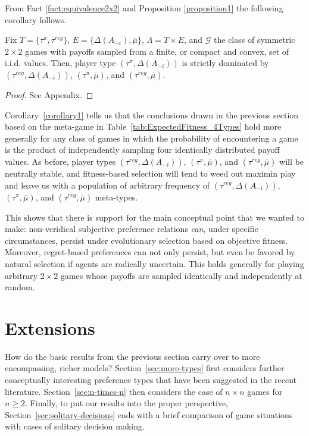 \documentclass[fleqn,reqno,11pt]{article}
\begin{document}
From Fact \ref{fact:equivalence2x2} and Proposition \ref{proposition1} the following corollary follows.

\begin{corollary} \label{corollary1}

  Fix $T = \lbrace \tau^{\pi}, \tau^{reg} \rbrace$,
  $E = \lbrace \Delta(A_{-i}), \overline{\mu} \rbrace$, $\Lambda= T \times E$, and
  $\mathcal{G}$ the class of symmetric $2 \times 2$ games with payoffs sampled from a finite,
  or compact and convex, set of i.i.d. values. Then, player type $(\tau^{\pi}, \Delta(A_{-i}))$
  is strictly dominated by $(\tau^{reg}, \Delta(A_{-i}))$, $(\tau^{\pi}, \overline{\mu})$, and
  $(\tau^{reg}, \overline{\mu})$.

\end{corollary}

\begin{proof}
See Appendix.
\end{proof}

Corollary~\ref{corollary1} tells us that the conclusions drawn in the previous section based on
the meta-game in Table~\ref{tab:ExpectedFitness_4Types} hold more generally for any class of
games in which the probability of encountering a game is the product of independently sampling
four identically distributed payoff values. As before, player types
$(\tau^{reg}, \Delta(A_{-i}))$, $(\tau^{\pi}, \overline{\mu})$, and
$(\tau^{reg}, \overline{\mu})$ will be neutrally stable, and fitness-based selection will tend
to weed out maximin play and leave us with a population of arbitrary frequency of
$(\tau^{reg}, \Delta(A_{-i}))$, $(\tau^{\pi}, \overline{\mu})$, and
$(\tau^{reg}, \overline{\mu})$ meta-types.

This shows that there is support for the main conceptual point that we wanted to make:
non-veridical subjective preference relations \emph{can}, under specific circumstances, persist
under evolutionary selection based on objective fitness. Moreover, regret-based preferences can
not only persist, but even be favored by natural selection if agents are radically
uncertain. This holds generally for playing arbitrary $2 \times 2$ games whose payoffs are
sampled identically and independently at random.

\section{Extensions}
\label{sec:extensions}

How do the basic results from the previous section carry over to more encompassing, richer
models? Section~\ref{sec:more-types} first considers further conceptually interesting
preference types that have been suggested in the recent literature. Section~\ref{sec:n-times-n}
then considers the case of $n \times n$ games for $n \ge 2$. Finally, to put our results into
the proper perspective, Section~\ref{sec:solitary-decisions} ends with a brief comparison of
game situations with cases of solitary decision making.
\end{document}
